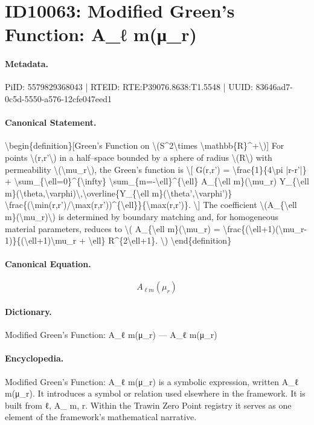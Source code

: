 \section*{ID10063: Modified Green’s Function: A\_ℓ m(μ\_r)}
\paragraph{Metadata.}
PiID: 5579829368043 | RTEID: RTE:P39076.8638:T1.5548 | UUID: 83646ad7-0c5d-5550-a576-12cfe047eed1

\paragraph{Canonical Statement.}
\textbackslash{}begin\{definition\}[Green’s Function on \textbackslash{}(S\textasciicircum{}2\textbackslash{}times \textbackslash{}mathbb\{R\}\textasciicircum{}+\textbackslash{})] For points \textbackslash{}(r,r'\textbackslash{}) in a half–space bounded by a sphere of radius \textbackslash{}(R\textbackslash{}) with permeability \textbackslash{}(\textbackslash{}mu\_r\textbackslash{}), the Green’s function is \textbackslash{}[ G(r,r') = \textbackslash{}frac\{1\}\{4\textbackslash{}pi |r-r'|\} + \textbackslash{}sum\_\{\textbackslash{}ell=0\}\textasciicircum{}\{\textbackslash{}infty\} \textbackslash{}sum\_\{m=-\textbackslash{}ell\}\textasciicircum{}\{\textbackslash{}ell\} A\_\{\textbackslash{}ell m\}(\textbackslash{}mu\_r) Y\_\{\textbackslash{}ell m\}(\textbackslash{}theta,\textbackslash{}varphi)\textbackslash{},\textbackslash{}overline\{Y\_\{\textbackslash{}ell m\}(\textbackslash{}theta',\textbackslash{}varphi')\} \textbackslash{}frac\{(\textbackslash{}min(r,r')/\textbackslash{}max(r,r'))\textasciicircum{}\{\textbackslash{}ell\}\}\{\textbackslash{}max(r,r')\}. \textbackslash{}] The coefficient \textbackslash{}(A\_\{\textbackslash{}ell m\}(\textbackslash{}mu\_r)\textbackslash{}) is determined by boundary matching and, for homogeneous material parameters, reduces to \textbackslash{}( A\_\{\textbackslash{}ell m\}(\textbackslash{}mu\_r) = \textbackslash{}frac\{(\textbackslash{}ell+1)(\textbackslash{}mu\_r-1)\}\{(\textbackslash{}ell+1)\textbackslash{}mu\_r + \textbackslash{}ell\} R\textasciicircum{}\{2\textbackslash{}ell+1\}. \textbackslash{}) \textbackslash{}end\{definition\}

\paragraph{Canonical Equation.}
\[
A_{\ell m}(\mu_r)
\]

\paragraph{Dictionary.}
Modified Green’s Function: A\_ℓ m(μ\_r) — A\_ℓ m(μ\_r)

\paragraph{Encyclopedia.}
Modified Green’s Function: A\_ℓ m(μ\_r) is a symbolic expression, written A\_ℓ m(μ\_r). It introduces a symbol or relation used elsewhere in the framework. It is built from ℓ, A\_ m, r. Within the Trawin Zero Point registry it serves as one element of the framework's mathematical narrative.
